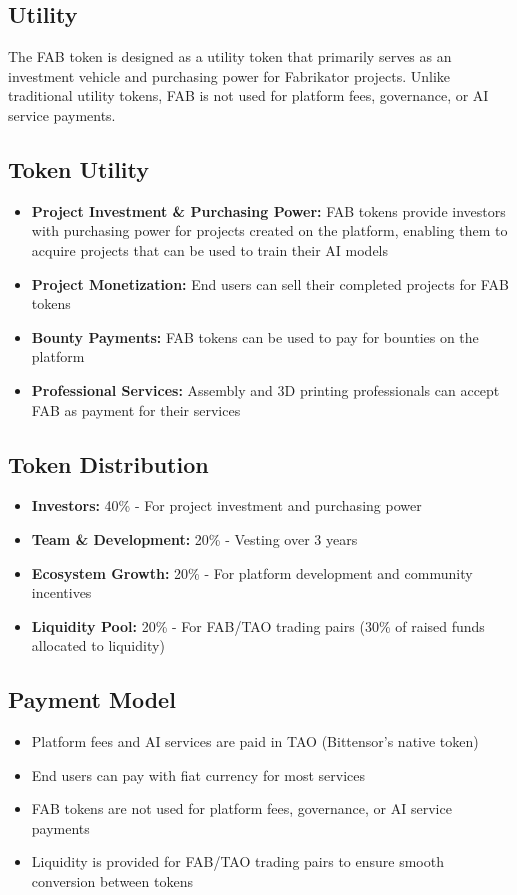 \subsection*{Utility}

The FAB token is designed as a utility token that primarily serves as an investment vehicle and purchasing power for Fabrikator projects. Unlike traditional utility tokens, FAB is not used for platform fees, governance, or AI service payments.

\subsection*{Token Utility}
\begin{itemize}[leftmargin=*]
    \item \textbf{Project Investment \& Purchasing Power:} FAB tokens provide investors with purchasing power for projects created on the platform, enabling them to acquire projects that can be used to train their AI models
    \item \textbf{Project Monetization:} End users can sell their completed projects for FAB tokens
    \item \textbf{Bounty Payments:} FAB tokens can be used to pay for bounties on the platform
    \item \textbf{Professional Services:} Assembly and 3D printing professionals can accept FAB as payment for their services
\end{itemize}

\subsection*{Token Distribution}
\begin{itemize}[leftmargin=*]
    \item \textbf{Investors:} 40\% - For project investment and purchasing power
    \item \textbf{Team \& Development:} 20\% - Vesting over 3 years
    \item \textbf{Ecosystem Growth:} 20\% - For platform development and community incentives
    \item \textbf{Liquidity Pool:} 20\% - For FAB/TAO trading pairs (30\% of raised funds allocated to liquidity)
\end{itemize}

\subsection*{Payment Model}
\begin{itemize}[leftmargin=*]
    \item Platform fees and AI services are paid in TAO (Bittensor's native token)
    \item End users can pay with fiat currency for most services
    \item FAB tokens are not used for platform fees, governance, or AI service payments
    \item Liquidity is provided for FAB/TAO trading pairs to ensure smooth conversion between tokens
\end{itemize}


